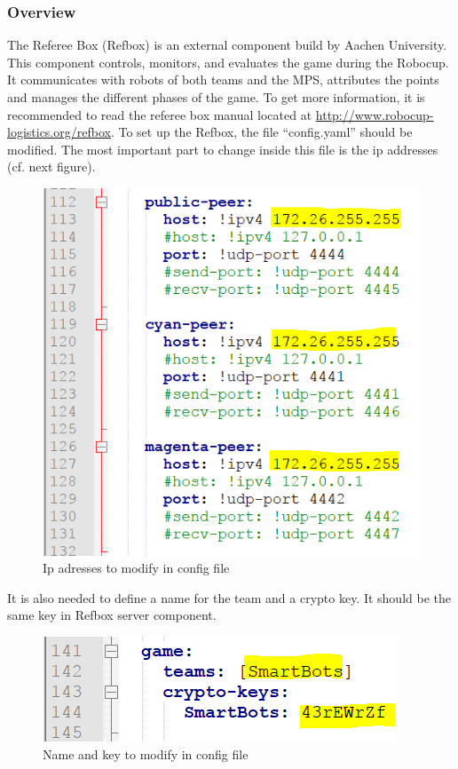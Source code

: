 
\subsubsection{Overview}

The Referee Box (Refbox) is an external component build by Aachen University. This component controls, monitors, and evaluates the game during the Robocup. It communicates with robots of both teams and the MPS, attributes the points and manages the different phases of the game. To get more information, it is recommended to read the referee box manual located at \url{http://www.robocup-logistics.org/refbox}. To set up the Refbox, the file “config.yaml” should be modified. The most important part to change inside this file is the ip addresses (cf. next figure). \\

\begin{figure}[!h]
\centering
\includegraphics[]{pic/config_file_1.png}
\caption{Ip adresses to modify in config file}
\label{fig:configFile1}
\end{figure}

It is also needed to define a name for the team and a crypto key. It should be the same key in Refbox server component.

\begin{figure}[!h]
\centering
\includegraphics[]{pic/config_file_2.png}
\caption{Name and key to modify in config file}
\label{fig:configFile2}
\end{figure}

